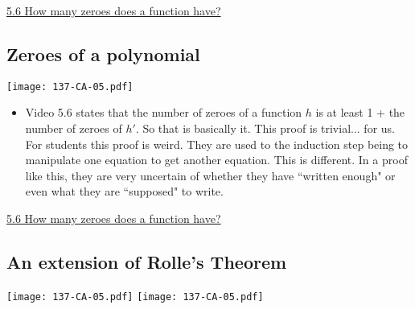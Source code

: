 \documentclass[11pt]{article}
\newcommand{\nl}{\hfill \vspace{-1.1\baselineskip}} %
\newcommand{\vvi}{\hspace{8mm} \href{https://www.youtube.com/watch?v=5TKUOC06JzM&list=PLlwePzQY_wW9m5oabUf6hvfVfAaA9uAwM&index=6}{5.6 How many zeroes does a function have?}}
\begin{document}
\begin{videos}
\vvi
\end{videos}

\newpage
\subsection{Zeroes of a polynomial}

\begin{center}
{ \texttt{[image: 137-CA-05.pdf]}} 
\end{center}


\begin{comments}
\nl
\begin{itemize}
\item Video 5.6 states that the number of zeroes of a function $h$ is at least 1 + the number of zeroes of $h'$.  So that is basically it.  This proof is trivial... for us.  For students this proof is weird.  They are used to the induction step being to manipulate one equation to get another equation.   This is different.  In a proof like this, they are very uncertain of whether they have ``written enough" or even what they are ``supposed" to write.
\end{itemize}	
\end{comments}

\begin{videos}
\vvi
\end{videos}

\newpage
\subsection{An extension of Rolle's Theorem}

\begin{center}
{ \texttt{[image: 137-CA-05.pdf]}}  \quad
{ \texttt{[image: 137-CA-05.pdf]}} 
\end{center}
\end{document}

